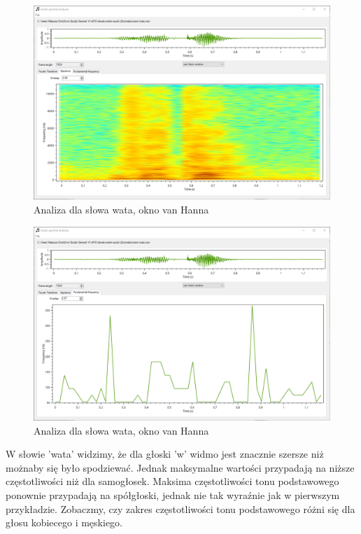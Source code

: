\documentclass{article}
\begin{document}
\begin{figure}[H]
\includegraphics[width=6in]{scr14.png}
\centering
\caption{Analiza dla słowa wata, okno van Hanna}
\end{figure}

\begin{figure}[H]
\includegraphics[width=6in]{scr15.png}
\centering
\caption{Analiza dla słowa wata, okno van Hanna}
\end{figure}

W słowie 'wata' widzimy, że dla głoski 'w' widmo jest znacznie szersze niż możnaby się było spodziewać. Jednak maksymalne wartości przypadają na niższe częstotliwości niż dla samogłosek. Maksima częstotliwości tonu podstawowego ponownie przypadają na spółgłoski, jednak nie tak wyraźnie jak w pierwszym przykładzie. Zobaczmy, czy zakres częstotliwości tonu podstawowego różni się dla głosu kobiecego i męskiego.
\end{document}
